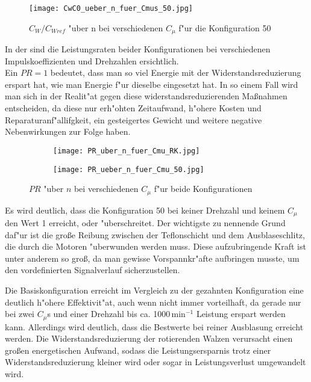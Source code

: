 \begin{figure}[h]
	\centering
	\texttt{[image: CwC0\_ueber\_n\_fuer\_Cmus\_50.jpg]}
	\caption{$C_{W}/C_{Wref}$ "uber n bei verschiedenen $C_{\mu}$ f"ur die Konfiguration 50}
	\label{fig:CwCwref/n Cmu 50}
\end{figure}

In der  sind die Leistungsraten beider Konfigurationen bei verschiedenen Impulskoeffizienten und Drehzahlen ersichtlich.\\
Ein $PR= 1$ bedeutet, dass man so viel Energie mit der Widerstandsreduzierung erspart hat, wie man Energie f"ur dieselbe eingesetzt hat. In so einem Fall wird man sich in der Realit"at gegen diese widerstandsreduzierenden Ma\ss{}nahmen entscheiden, da diese nur erh"ohten Zeitaufwand, h"ohere Kosten und Reparaturanf"allifgkeit, ein gesteigertes Gewicht und weitere negative Nebenwirkungen zur Folge haben.

\begin{figure}[h]
	\centering
	\begin{subfigure}[c]{0.45\textwidth}		
		\texttt{[image: PR\_uber\_n\_fuer\_Cmu\_RK.jpg]}
		\label{fig:PR RK}
	\end{subfigure}
	\begin{subfigure}[c]{0.45\textwidth}
		\texttt{[image: PR\_ueber\_n\_fuer\_Cmu\_50.jpg]}
		\label{fig:PR 50}
	\end{subfigure}
		\caption{$PR$ "uber $n$ bei verschiedenen $C_{\mu}$ f"ur beide Konfigurationen}
	\label{fig:PR}
\end{figure}

Es wird deutlich, dass die Konfiguration 50 bei keiner Drehzahl und keinem $C_{\mu}$ den Wert 1 erreicht, oder "uberschreitet. Der wichtigste zu nennende Grund daf"ur ist die gro\ss{}e Reibung zwischen der Teflonschicht und dem Ausblaseschlitz, die durch die Motoren "uberwunden werden muss. Diese aufzubringende Kraft ist unter anderem so gro\ss{}, da man gewisse Vorspannkr"afte aufbringen musste, um den vordefinierten Signalverlauf sicherzustellen.

Die Basiskonfiguration erreicht im Vergleich zu der gezahnten Konfiguration eine deutlich h"ohere Effektivit"at, auch wenn nicht immer vorteilhaft, da gerade nur bei zwei $C_{\mu}$s und einer Drehzahl bis ca. 1000\,$\mathrm{min^{-1}}$ Leistung erspart werden kann. Allerdings wird deutlich, dass die Bestwerte bei reiner Ausblasung erreicht werden. Die Widerstandsreduzierung der rotierenden Walzen verursacht einen gro\ss{}en energetischen Aufwand, sodass die Leistungsersparnis trotz einer Widerstandsreduzierung kleiner wird oder sogar in Leistungsverlust umgewandelt wird.